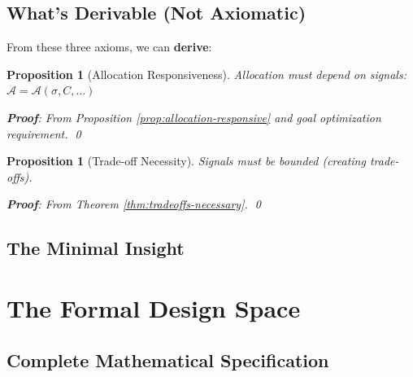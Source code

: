 \documentclass[11pt,a4paper]{article}
\newtheorem{proposition}[theorem]{Proposition}
\theoremstyle{definition}
\theoremstyle{remark}
\newcommand{\A}{\mathcal{A}}
\begin{document}
\subsection{What's Derivable (Not Axiomatic)}

From these three axioms, we can \textbf{derive}:

\begin{proposition}[Allocation Responsiveness]
Allocation must depend on signals: $\A = \A(\sigma, C, \ldots)$

\textbf{Proof}: From Proposition \ref{prop:allocation-responsive} and goal optimization requirement. \qed
\end{proposition}

\begin{proposition}[Trade-off Necessity]
Signals must be bounded (creating trade-offs).

\textbf{Proof}: From Theorem \ref{thm:tradeoffs-necessary}. \qed
\end{proposition}

\subsection{The Minimal Insight}

\begin{center}
\end{center}

\section{The Formal Design Space}

\subsection{Complete Mathematical Specification}
\end{document}

